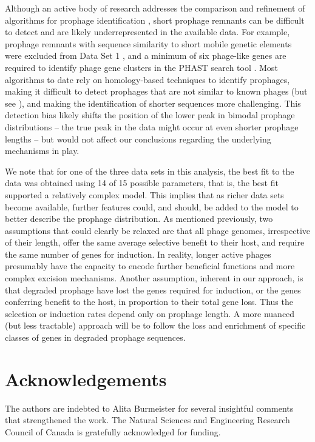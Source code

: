 Although an active body of research addresses the comparison and refinement of algorithms for prophage identification \citep{song_prophage_2019, sousa_phageweb_2018}, short prophage remnants can be difficult to detect and are likely underrepresented in the available data.  For example, prophage remnants with sequence similarity to short mobile genetic elements were excluded from Data Set 1 \citep{bobay_pervasive_2014}, and a minimum of six phage-like genes are required to identify phage gene clusters in the PHAST search tool \citep{zhou_phast:_2011}. 
Most algorithms to date rely on homology-based techniques to identify prophages, making it difficult to detect prophages that are not similar to known phages (but see \cite{akhter_phispy:_2012}), and making the identification of shorter sequences more challenging.   
This detection bias likely shifts the position of the lower peak in bimodal prophage distributions -- the true peak in the data might occur at even shorter prophage lengths -- but would not affect our conclusions regarding the underlying mechanisms in play.

We note that for one of the three data sets in this analysis, the best fit to the data was obtained using 14 of 15 possible parameters, that is, the best fit supported a relatively complex model.  This implies that as richer data sets become available, further features could, and should, be added to the model to better describe the prophage distribution.  As mentioned previously, two assumptions that could clearly be relaxed are that all phage genomes, irrespective of their length, offer the same average selective benefit to their host, and require the same number of genes for induction.  In reality, longer active phages presumably have the capacity to encode further beneficial functions and more complex excision mechanisms.  Another assumption, inherent in our approach, is that degraded prophage have lost the genes required for induction, or the genes conferring benefit to the host, in proportion to their total gene loss.  Thus the selection or induction rates depend only on prophage length. A more nuanced (but less tractable) approach will be to follow the loss and enrichment of specific classes of genes in degraded prophage sequences.

\section*{Acknowledgements}
The authors are indebted to Alita Burmeister for several insightful comments that strengthened the work.  The Natural Sciences and Engineering Research Council of Canada is gratefully acknowledged for funding.
 
